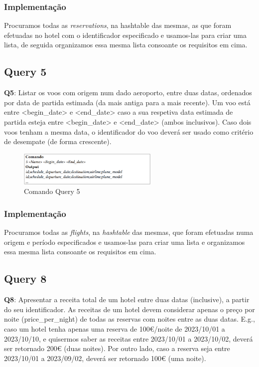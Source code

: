 \documentclass[11pt]{article}
\begin{document}
\subsubsection{Implementação}
Procuramos todas as \textit{reservations}, na hashtable das mesmas, as que foram efetuadas no hotel com o identificador especificado e usamos-las para criar uma lista, de seguida organizamos essa mesma lista consoante os requisitos em cima.

\newpage
\subsection{Query 5}
\textbf{Q5}: Listar os voos com origem num dado aeroporto, entre duas datas, ordenados por data de partida
estimada (da mais antiga para a mais recente). Um voo está entre <begin_date> e <end_date> caso a
sua respetiva data estimada de partida esteja entre <begin_date> e <end_date> (ambos inclusivos).
Caso dois voos tenham a mesma data, o identificador do voo deverá ser usado como critério de
desempate (de forma crescente).

\begin{figure}[hbt!]
    \centering
    \includegraphics[width=0.6\textwidth]{comandq5.png}
    \caption{Comando Query 5}
    \label{fig:example}
\end{figure}

\subsubsection{Implementação}
Procuramos todas as \textit{flights}, na \textit{hashtable} das mesmas, que foram efetuadas numa origem e período especificados e usamos-las para criar uma lista e organizamos essa mesma lista consoante os requisitos em cima.

\subsection{Query 8}
\textbf{Q8}: Apresentar a receita total de um hotel entre duas datas (inclusive), a partir do seu identificador. As receitas de um hotel devem considerar apenas o preço por noite (price_per_night) de todas as
reservas com noites entre as duas datas. E.g., caso um hotel tenha apenas uma reserva de 100€/noite de 2023/10/01 a 2023/10/10, e quisermos saber as receitas entre 2023/10/01 a 2023/10/02, deverá ser retornado 200€ (duas noites). Por outro lado, caso a reserva seja entre 2023/10/01 a 2023/09/02, deverá ser retornado 100€ (uma noite).
\end{document}
